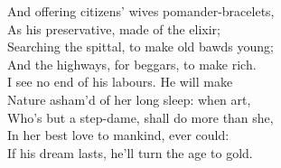 \documentclass{memoir}
\begin{document}
\begin{drama*}
 And offering citizens' wives pomander-bracelets,\\
 As his preservative, made of the elixir;\\
 Searching the spittal, to make old bawds young;\\
 And the highways, for beggars, to make rich.\\
 I see no end of his labours. He will make\\
 Nature asham'd of her long sleep: when art,\\
 Who's but a step-dame, shall do more than she,\\
 In her best love to mankind, ever could:\\
 If his dream lasts, he'll turn the age to gold.\\
\act

\scene


\end{drama*}
\end{document}
